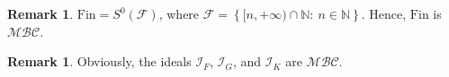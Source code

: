 \documentclass{amsart}
\theoremstyle{definition}
\newtheorem{df}[thm]{Definition}
\newtheorem{remark}[thm]{Remark}
\theoremstyle{definition}
\newcommand{\N}{{\mathbb N}}
\newcommand{\Fin}{\textrm{Fin}}
\newcommand{\I}{\mathcal I}
\newcommand{\T}{\mathcal{T}}
\newcommand{\MB}{S^0}  %
\newcommand{\MBC}{\mathcal{MBC}}
\begin{document}
\begin{remark} 
$\Fin = \MB(\mathcal{F})$, where $\mathcal{F}= \left\{[n, +\infty)\cap\N :\ n\in\N\right\}$. Hence, $\Fin$ is $\MBC$.
\end{remark}

\begin{remark} 
Obviously, the ideals $\I_F$, $\I_G$, and $\I_K$ are $\MBC$.
\end{remark}






\end{document}
